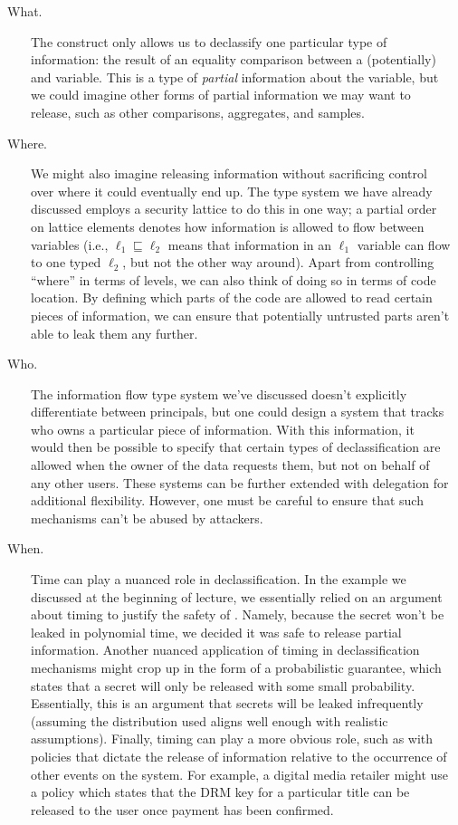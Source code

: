 \documentclass[11pt,twoside]{scrartcl}
\begin{document}
\begin{description}
\item[\ \ What.] The  construct only allows us to declassify one particular type of information: the result of an equality comparison between a (potentially) \hisec and \lowsec variable. This is a type of \emph{partial} information about the \hisec variable, but we could imagine other forms of partial information we may want to release, such as other comparisons, aggregates, and samples.

\item[\ \ Where.] We might also imagine releasing information without sacrificing control over where it could eventually end up. The type system we have already discussed employs a security lattice to do this in one way; a partial order on lattice elements denotes how information is allowed to flow between variables (i.e., $\ell_1 \sqsubseteq \ell_2$ means that information in an $\ell_1$ variable can flow to one typed $\ell_2$, but not the other way around). Apart from controlling ``where'' in terms of levels, we can also think of doing so in terms of code location. By defining which parts of the code are allowed to read certain pieces of information, we can ensure that potentially untrusted parts aren't able to leak them any further.

\item[\ \ Who.] The information flow type system we've discussed doesn't explicitly differentiate between principals, but one could design a system that tracks who owns a particular piece of information. With this information, it would then be possible to specify that certain types of declassification are allowed when the owner of the data requests them, but not on behalf of any other users. These systems can be further extended with delegation for additional flexibility. However, one must be careful to ensure that such mechanisms can't be abused by attackers.

\item[\ \ When.] Time can play a nuanced role in declassification. In the example we discussed at the beginning of lecture, we essentially relied on an argument about timing to justify the safety of . Namely, because the secret won't be leaked in polynomial time, we decided it was safe to release partial information. Another nuanced application of timing in declassification mechanisms might crop up in the form of a probabilistic guarantee, which states that a secret will only be released with some small probability. Essentially, this is an argument that secrets will be leaked infrequently (assuming the distribution used aligns well enough with realistic assumptions). Finally, timing can play a more obvious role, such as with policies that dictate the release of information relative to the occurrence of other events on the system. For example, a digital media retailer might use a policy which states that the DRM key for a particular title can be released to the user once payment has been confirmed.
\end{description}
\end{document}
